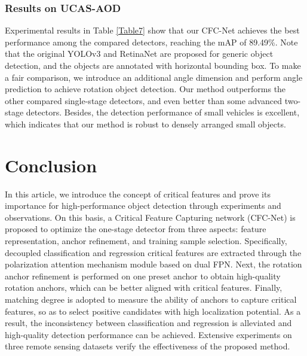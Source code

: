 \documentclass[journal]{IEEEtran}
\begin{document}
\subsubsection{Results on UCAS-AOD}
Experimental results in Table \ref{Table7} show that our CFC-Net achieves the best performance among the compared detectors, reaching the mAP of 89.49\%. Note that the original YOLOv3\cite{redmon2018yolov3} and RetinaNet\cite{lin2017focal} are proposed for generic object detection, and the objects are annotated with horizontal bounding box. To make a fair comparison, we introduce an additional angle dimension and perform angle prediction to achieve rotation object detection. Our method outperforms the other compared single-stage detectors, and even better than some advanced two-stage detectors. Besides, the detection performance of small vehicles is excellent, which indicates that our method is robust to densely arranged small objects. 








   


\section{Conclusion}
In this article, we introduce the concept of critical features and prove its importance for high-performance object detection through experiments and observations. On this basis, a Critical Feature Capturing network (CFC-Net) is proposed to optimize the one-stage detector from three aspects: feature representation, anchor refinement, and training sample selection. Specifically, decoupled classification and regression critical features are extracted through the polarization attention mechanism module based on dual FPN. Next, the rotation anchor refinement is performed on one preset anchor to obtain high-quality rotation anchors, which can be better aligned with critical features. Finally, matching degree is adopted to measure the ability of anchors to capture critical features, so as to select positive candidates with high localization potential. As a result, the inconsistency between classification and regression is alleviated and high-quality detection performance can be achieved. Extensive experiments on three remote sensing datasets verify the effectiveness of the proposed method. 






































\ifCLASSOPTIONcaptionsoff
  \newpage
\fi









\end{document}
